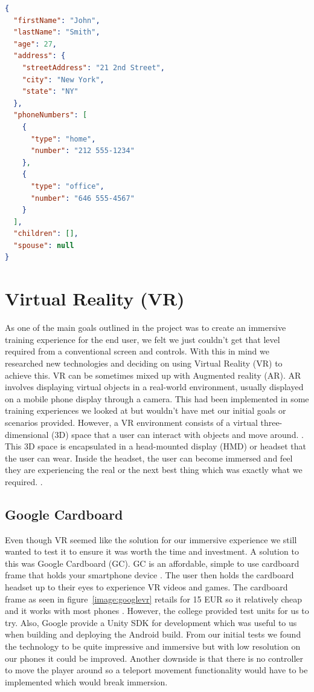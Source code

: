 \begin{lstlisting}[language=JSON]
{
  "firstName": "John",
  "lastName": "Smith",
  "age": 27,
  "address": {
    "streetAddress": "21 2nd Street",
    "city": "New York",
    "state": "NY"
  },
  "phoneNumbers": [
    {
      "type": "home",
      "number": "212 555-1234"
    },
    {
      "type": "office",
      "number": "646 555-4567"
    }
  ],
  "children": [],
  "spouse": null
}
\end{lstlisting}

\section{Virtual Reality (VR)}
As one of the main goals outlined in the project was to create an immersive training experience for the end user, we felt we just couldn't get that level required from a conventional screen and controls. With this in mind we researched new technologies and deciding on using Virtual Reality (VR) to achieve this. VR can be sometimes mixed up with Augmented reality (AR). AR involves displaying virtual objects in a real-world environment, usually displayed on a mobile phone display through a camera. This had been implemented in some training experiences we looked at but wouldn't have met our initial goals or scenarios provided. However, a VR environment consists of a virtual three-dimensional (3D) space that a user can interact with objects and move around. \cite{isdale1998virtual}. This 3D space is encapsulated in a head-mounted display (HMD) or headset that the user can wear. Inside the headset, the user can become immersed and feel they are experiencing the real or the next best thing which was exactly what we required. \cite{isdale1998virtual}. 

\subsection{Google Cardboard}
Even though VR seemed like the solution for our immersive experience we still wanted to test it to ensure it was worth the time and investment. A solution to this was Google Cardboard (GC). GC is an affordable, simple to use cardboard frame that holds your smartphone device \cite{12335197120170501}. The user then holds the cardboard headset up to their eyes to experience VR videos and games. The cardboard frame as seen in figure~\ref{image:googlevr} retails for 15 EUR so it relatively cheap and it works with most phones \cite{12335197120170501}. However, the college provided test units for us to try. Also, Google provide a Unity SDK for development which was useful to us when building and deploying the Android build. From our initial tests we found the technology to be quite impressive and immersive but with low resolution on our phones it could be improved. Another downside is that there is no controller to move the player around so a teleport movement functionality would have to be implemented which would break immersion.

